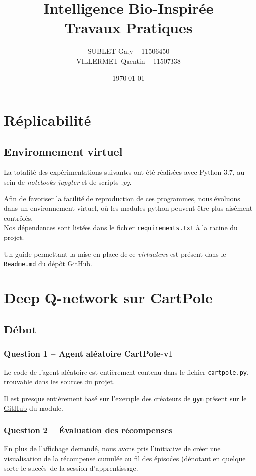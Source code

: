 \documentclass[12pt,french]{article}
\author{SUBLET Gary -- 11506450 \\[.3em] VILLERMET Quentin -- 11507338}
\date{\today}
\title{Intelligence Bio-Inspirée \\[.5em] Travaux Pratiques}
\begin{document}

\tableofcontents
\newpage

\section{Réplicabilité}
\subsection{Environnement virtuel}

La totalité des expérimentations suivantes ont été réalisées avec Python 3.7, au sein de \textit{notebooks jupyter} et de scripts \textit{.py}.

Afin de favoriser la facilité de reproduction de ces programmes, nous évoluons dans un environnement virtuel, où les modules python peuvent être plus aisément contrôlés. \\
Nos dépendances sont listées dans le fichier \texttt{requirements.txt} à la racine du projet.

Un guide permettant la mise en place de ce \textit{virtualenv} est présent dans le \texttt{Readme.md} du dépôt GitHub.

\section{Deep Q-network sur CartPole}
\subsection{Début}
\subsubsection{Question 1 -- Agent aléatoire CartPole-v1}

Le code de l'agent aléatoire est entièrement contenu dans le fichier \texttt{cartpole.py}, trouvable dans les sources du projet.

Il est presque entièrement basé sur l'exemple des créateurs de \texttt{gym} présent sur le \href{https://github.com/openai/gym}{GitHub} du module.

\subsubsection{Question 2 -- Évaluation des récompenses}

\begin{note}
En plus de l'affichage demandé, nous avons pris l'initiative de créer une visualisation de la récompense cumulée au fil des épisodes (dénotant en quelque sorte le \og succès\fg\, de la session d'apprentissage.
\end{note}
\end{document}
